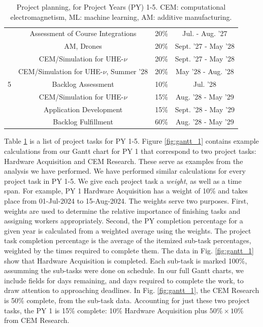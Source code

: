 \documentclass[10pt]{amsart}
\theoremstyle{definition}
\numberwithin{equation}{section}
\begin{document}
\begin{table}[ht]
\begin{tabular}{c | c | c | c}
 & Assessment of Course Integrations & 20\% & Jul. - Aug. '27 \\
 & AM, Drones & 20\% & Sept. '27 - May '28 \\
 & CEM/Simulation for UHE-$\nu$ & 20\% & Sept. '27 - May '28 \\
 & CEM/Simulation for UHE-$\nu$, Summer '28 & 20\% & May '28 - Aug. '28 \\
\hline
5 & Backlog Assessment & 10\% & Jul. '28 \\
 & CEM/Simulation for UHE-$\nu$ & 15\% & Aug. '28 - May '29 \\
 & Application Development & 15\% & Sept. '28 - May '29 \\
 & Backlog Fulfillment & 60\% & Aug. '28 - May '29 \\ 
\hline
\end{tabular}
\caption{\label{tab:plan} Project planning, for Project Years (PY) 1-5.  CEM: computational electromagnetism, ML: machine learning, AM: additive manufacturing.}
\end{table}

Table \ref{tab:plan} is a list of project tasks for PY 1-5.  Figure \ref{fig:gantt_1} contains example calculations from our Gantt chart for PY 1 that correspond to two project tasks: Hardware Acquisition and CEM Research.  These serve as examples from the analysis we have performed.  We have performed similar calculations for every project task in PY 1-5.  We give each project task a \textit{weight}, as well as a time span.  For example, PY 1 Hardware Acquisition has a weight of 10\% and takes place from 01-Jul-2024 to 15-Aug-2024.  The weights serve two purposes.  First, weights are used to determine the relative importance of finishing tasks and assigning workers appropriately.  Second, the PY completion percentage for a given year is calculated from a weighted average using the weights.  The project task completion percentage is the average of the itemized sub-task percentages, weighted by the times required to complete them.  The data in Fig. \ref{fig:gantt_1} show that Hardware Acquisition is completed.  Each sub-task is marked 100\%, assumming the sub-tasks were done on schedule.  In our full Gantt charts, we include fields for days remaining, and days required to complete the work, to draw attention to approaching deadlines.  In Fig. \ref{fig:gantt_1}, the CEM Research is 50\% complete, from the sub-task data.  Accounting for just these two project tasks, the PY 1 is 15\% complete: 10\% Hardware Acquisition plus $50\% \times 10\%$ from CEM Research. 
\end{document}
